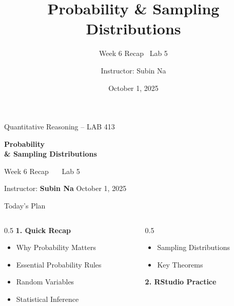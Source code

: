 \documentclass[aspectratio=169,11pt]{beamer}
\title{\bfseries Probability \& Sampling Distributions}
\subtitle{Week 6 Recap \textbullet\ Lab 5}
\author{Instructor: Subin Na}
\institute{Quantitative Reasoning -- LAB 413}
\date{October 1, 2025}
\begin{document}
{
\begin{frame}
  \vfill
  {\color{qrgray}\small Quantitative Reasoning -- LAB 413}\\[0.6em]
  {\color{qrnavy}\huge\bfseries Probability\\[0.15em]\& Sampling Distributions\par}
  \vspace{0.4em}
  {\color{qrblue}\large Week 6 Recap \ \textbullet\ \ Lab 5}\par
  \vspace{1.6em}
  {\color{qrgray} Instructor: \textbf{Subin Na} \hfill October 1, 2025}
  \vfill
\end{frame}
}

\begin{frame}{Today's Plan}
  \begin{columns}[T]
    \begin{column}{0.5\textwidth}
      \textbf{\color{qrnavy}1. Quick Recap}
      \begin{itemize}
        \item Why Probability Matters
        \item Essential Probability Rules
        \item Random Variables
        \item Statistical Inference
      \end{itemize}
    \end{column}
    \begin{column}{0.5\textwidth}
      \begin{itemize}
        \item Sampling Distributions
        \item Key Theorems
      \end{itemize}
      \vspace{0.8em}
      \textbf{\color{qrnavy}2. RStudio Practice}
    \end{column}
  \end{columns}
\end{frame}
\end{document}
